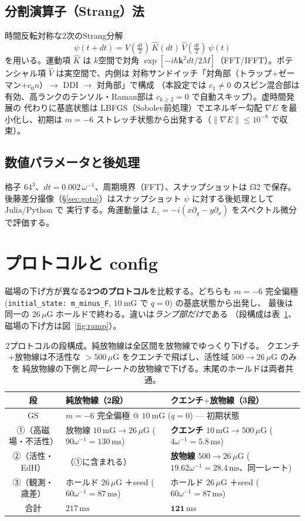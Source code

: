 \documentclass[11pt]{ltjsarticle}
\newcommand{\uG}{\,\mu\mathrm{G}}
\newcommand{\ms}{\,\mathrm{ms}}
\newcommand{\wref}{\omega^{-1}}
\begin{document}
\subsection{分割演算子（Strang）法}
時間反転対称な2次のStrang分解
\begin{equation}
\psi(t+dt)=\hat V(\tfrac{dt}{2})\,\hat K(dt)\,\hat V(\tfrac{dt}{2})\,\psi(t)
\end{equation}
を用いる。運動項 $\hat K$ は $k$空間で対角
$\exp[-i\hbar \mathbf k^2 dt/2M]$（FFT/IFFT）。ポテンシャル項 $\hat V$ は実空間で、内側は
対称サンドイッチ「対角部（トラップ$+$ゼーマン$+c_0 n$）$\to$ DDI $\to$ 対角部」で構成
（本設定では $c_1\neq0$ のスピン混合部は有効、高ランクのテンソル・Raman部は $c_{k\ge2}{=}0$ で自動スキップ）。虚時間発展の
代わりに基底状態は LBFGS（Sobolev前処理）でエネルギー勾配 $\nabla E$ を最小化し、初期は
$m{=}{-}6$ ストレッチ状態から出発する（$\|\nabla E\|\le10^{-8}$ で収束）。

\subsection{数値パラメータと後処理}
格子 $64^3$、$dt=0.002\,\wref$、周期境界（FFT）、スナップショットは f32 で保存。
後藤差分撮像（\S\ref{sec:goto}）はスナップショット $\psi$ に対する後処理として Julia/Python で
実行する。角運動量は $L_z=-i(x\partial_y-y\partial_x)$ をスペクトル微分で評価する。

\section{プロトコルと config}
磁場の下げ方が異なる\textbf{2つのプロトコル}を比較する。どちらも $m{=}{-}6$ 完全偏極
(\texttt{initial\_state:\,m\_minus\_F}, $10\ \mathrm{mG}$ で $q{=}0$) の基底状態から出発し、
最後は同一の $26\uG$ ホールドで終わる。違いは\emph{ランプ部だけ}である
（段構成は表~\ref{tab:proto}、磁場の下げ方は図~\ref{fig:ramp}）。

\begin{table}[h]\centering
\begin{tabular}{cll}
\toprule
段 & 純放物線（2段） & クエンチ$+$放物線（3段）\\\midrule
GS & \multicolumn{2}{l}{$m{=}{-}6$ 完全偏極 @ $10\ \mathrm{mG}$ ($q{=}0$) --- 初期状態}\\[2pt]
①（高磁場・不活性） & 放物線 $10\,\mathrm{mG}\!\to\!26\uG$ ($90\wref{=}130\ms$) & \textbf{クエンチ} $10\,\mathrm{mG}\!\to\!500\uG$ ($4\wref{=}5.8\ms$)\\[2pt]
②（活性・EdH） & （①に含まれる） & \textbf{放物線} $500\!\to\!26\uG$ ($19.62\wref{=}28.4\ms$、同一レート)\\[2pt]
③（観測・歳差） & ホールド $26\uG$ ＋seed ($60\wref{=}87\ms$) & ホールド $26\uG$ ＋seed ($60\wref{=}87\ms$)\\\midrule
合計 & $217\ms$ & $\mathbf{121\ms}$\\
\bottomrule
\end{tabular}
\caption{2プロトコルの段構成。純放物線は全区間を放物線でゆっくり下げる。
クエンチ$+$放物線は不活性な $>\!500\uG$ をクエンチで飛ばし、活性域 $500\!\to\!26\uG$ のみを
純放物線の下側と\emph{同一レート}の放物線で下げる。末尾のホールドは両者共通。}
\label{tab:proto}
\end{table}
\end{document}
